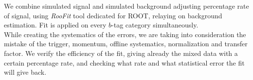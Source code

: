 We combine simulated signal and simulated background adjusting percentage rate of 
signal, using \textit{RooFit} tool dedicated for ROOT, relaying on background estimation. Fit is applied on every
$b$-tag category simultaneously.\\

While creating the systematics of the errors, we are taking into consideration the mistake of the trigger, momentum, offline
systematics, normalization and transfer factor.
We verify the efficiency of the fit, giving already the mixed data with a certain percentage rate, and checking
what rate and what statistical error the fit will give back.